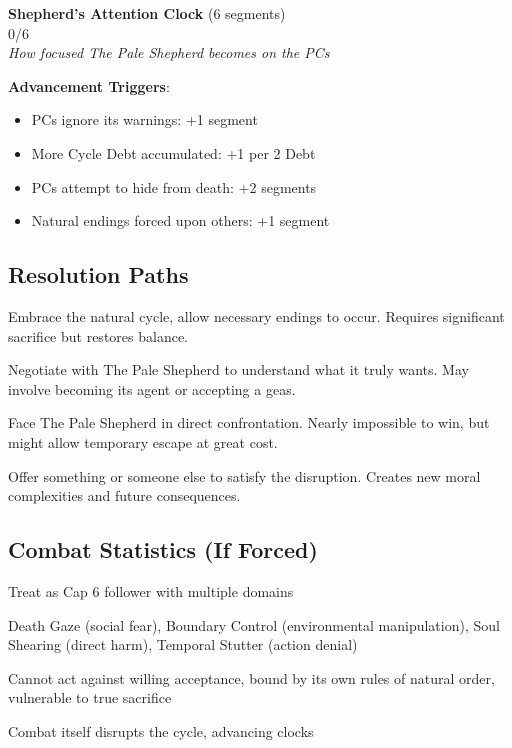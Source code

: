 \documentclass[11pt]{article}
\newcommand{\clocksegment}{\textbullet}
\begin{document}
\begin{center}
\textbf{Shepherd's Attention Clock} (6 segments)\\
\fbox{\clocksegment\clocksegment\clocksegment\clocksegment\clocksegment\clocksegment} 0/6\\
\textit{How focused The Pale Shepherd becomes on the PCs}
\end{center}

\textbf{Advancement Triggers}:
\begin{itemize}[leftmargin=*]
\item PCs ignore its warnings: +1 segment
\item More Cycle Debt accumulated: +1 per 2 Debt
\item PCs attempt to hide from death: +2 segments
\item Natural endings forced upon others: +1 segment
\end{itemize}

\subsection*{Resolution Paths}

\begin{description}[leftmargin=*]
\item[Acceptance] Embrace the natural cycle, allow necessary endings to occur. Requires significant sacrifice but restores balance.
\item[The Bargain] Negotiate with The Pale Shepherd to understand what it truly wants. May involve becoming its agent or accepting a geas.
\item[The Reckoning] Face The Pale Shepherd in direct confrontation. Nearly impossible to win, but might allow temporary escape at great cost.
\item[The Substitute] Offer something or someone else to satisfy the disruption. Creates new moral complexities and future consequences.
\end{description}

\subsection*{Combat Statistics (If Forced)}

\begin{description}[leftmargin=*]
\item[Scale] Treat as Cap 6 follower with multiple domains
\item[Abilities] Death Gaze (social fear), Boundary Control (environmental manipulation), Soul Shearing (direct harm), Temporal Stutter (action denial)
\item[Weaknesses] Cannot act against willing acceptance, bound by its own rules of natural order, vulnerable to true sacrifice
\item[Consequences] Combat itself disrupts the cycle, advancing clocks
\end{description}
\end{document}
